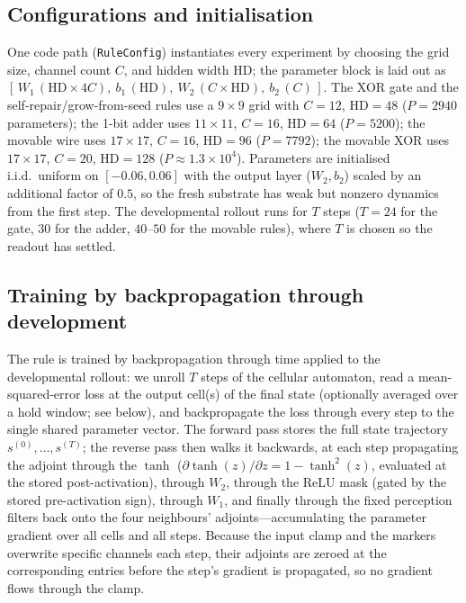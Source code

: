 \subsection*{Configurations and initialisation}

One code path (\texttt{RuleConfig}) instantiates every experiment by choosing the grid size, channel count $C$, and hidden width $\mathrm{HD}$; the parameter block is laid out as $[\,W_1\,(\mathrm{HD}\times 4C),\ b_1\,(\mathrm{HD}),\ W_2\,(C\times \mathrm{HD}),\ b_2\,(C)\,]$. The XOR gate and the self-repair/grow-from-seed rules use a $9\times9$ grid with $C=12$, $\mathrm{HD}=48$ ($P=2940$ parameters); the 1-bit adder uses $11\times11$, $C=16$, $\mathrm{HD}=64$ ($P=5200$); the movable wire uses $17\times17$, $C=16$, $\mathrm{HD}=96$ ($P=7792$); the movable XOR uses $17\times17$, $C=20$, $\mathrm{HD}=128$ ($P\approx1.3\times10^{4}$). Parameters are initialised i.i.d.\ uniform on $[-0.06, 0.06]$ with the output layer ($W_2, b_2$) scaled by an additional factor of $0.5$, so the fresh substrate has weak but nonzero dynamics from the first step. The developmental rollout runs for $T$ steps ($T=24$ for the gate, $30$ for the adder, $40$--$50$ for the movable rules), where $T$ is chosen so the readout has settled.

\subsection*{Training by backpropagation through development}

The rule is trained by backpropagation through time \citep{werbos1990bptt} applied to the developmental rollout: we unroll $T$ steps of the cellular automaton, read a mean-squared-error loss at the output cell(s) of the final state (optionally averaged over a hold window; see below), and backpropagate the loss through every step to the single shared parameter vector. The forward pass stores the full state trajectory $s^{(0)},\dots,s^{(T)}$; the reverse pass then walks it backwards, at each step propagating the adjoint through the $\tanh$ ($\partial \tanh(z)/\partial z = 1 - \tanh^2(z)$, evaluated at the stored post-activation), through $W_2$, through the ReLU mask (gated by the stored pre-activation sign), through $W_1$, and finally through the fixed perception filters back onto the four neighbours' adjoints---accumulating the parameter gradient over all cells and all steps. Because the input clamp and the markers overwrite specific channels each step, their adjoints are zeroed at the corresponding entries before the step's gradient is propagated, so no gradient flows through the clamp.

